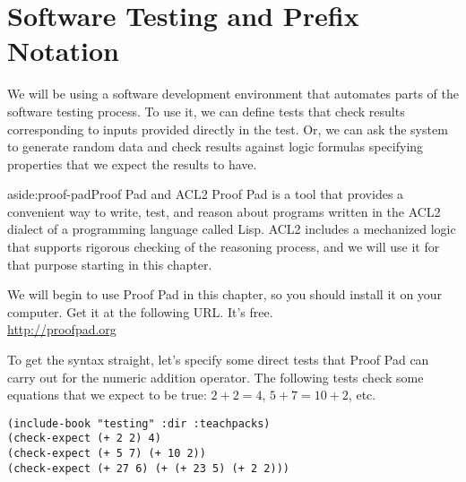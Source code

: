 \chapter{Software Testing and Prefix Notation}
\label{ch:software-testing-prefix-notation}


We will be using a software development environment that automates parts of the software testing process.
To use it, we can define tests that check results corresponding to inputs provided directly in the test.
Or, we can ask the system to generate random data and
check results against logic formulas specifying properties that we expect the results to have.

\begin{aside}{aside:proof-pad}{Proof Pad and ACL2}
Proof Pad is a tool that provides a convenient way
to write, test, and reason about programs
written in the ACL2 dialect of a programming language called Lisp.
ACL2 includes a mechanized logic that
supports rigorous checking of the reasoning process,
and we will use it for that purpose starting in this chapter.

We will begin to use Proof Pad in this chapter,
so you should install it on your computer.
Get it at the following URL. It's free.\\
\hspace*{38mm}\url{http://proofpad.org}
\end{aside}

To get the syntax straight,
let's specify some direct tests that Proof Pad
can carry out for the numeric addition operator.
The following tests check some equations that we expect to be true:
$2 + 2 = 4$, $5 + 7 = 10 + 2$, etc.

\begin{code}
\begin{verbatim}
(include-book "testing" :dir :teachpacks)
(check-expect (+ 2 2) 4)
(check-expect (+ 5 7) (+ 10 2))
(check-expect (+ 27 6) (+ (+ 23 5) (+ 2 2)))
\end{verbatim}
\end{code}

